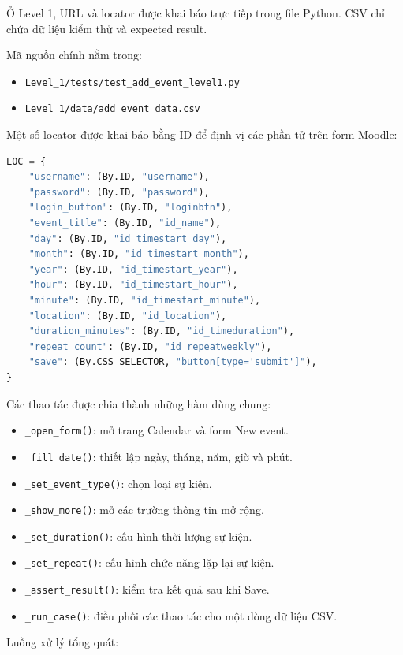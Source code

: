 \documentclass[12pt,a4paper]{article}
\begin{document}
Ở Level 1, URL và locator được khai báo trực tiếp trong file Python. CSV chỉ chứa dữ liệu kiểm thử và expected result.

Mã nguồn chính nằm trong:

\begin{itemize}[noitemsep]
    \item \texttt{Level\_1/tests/test\_add\_event\_level1.py}
    \item \texttt{Level\_1/data/add\_event\_data.csv}
\end{itemize}

Một số locator được khai báo bằng ID để định vị các phần tử trên form Moodle:

\begin{lstlisting}[language=Python]
LOC = {
    "username": (By.ID, "username"),
    "password": (By.ID, "password"),
    "login_button": (By.ID, "loginbtn"),
    "event_title": (By.ID, "id_name"),
    "day": (By.ID, "id_timestart_day"),
    "month": (By.ID, "id_timestart_month"),
    "year": (By.ID, "id_timestart_year"),
    "hour": (By.ID, "id_timestart_hour"),
    "minute": (By.ID, "id_timestart_minute"),
    "location": (By.ID, "id_location"),
    "duration_minutes": (By.ID, "id_timeduration"),
    "repeat_count": (By.ID, "id_repeatweekly"),
    "save": (By.CSS_SELECTOR, "button[type='submit']"),
}
\end{lstlisting}

Các thao tác được chia thành những hàm dùng chung:

\begin{itemize}[noitemsep]
    \item \texttt{\_open\_form()}: mở trang Calendar và form New event.
    \item \texttt{\_fill\_date()}: thiết lập ngày, tháng, năm, giờ và phút.
    \item \texttt{\_set\_event\_type()}: chọn loại sự kiện.
    \item \texttt{\_show\_more()}: mở các trường thông tin mở rộng.
    \item \texttt{\_set\_duration()}: cấu hình thời lượng sự kiện.
    \item \texttt{\_set\_repeat()}: cấu hình chức năng lặp lại sự kiện.
    \item \texttt{\_assert\_result()}: kiểm tra kết quả sau khi Save.
    \item \texttt{\_run\_case()}: điều phối các thao tác cho một dòng dữ liệu CSV.
\end{itemize}

Luồng xử lý tổng quát:
\end{document}

